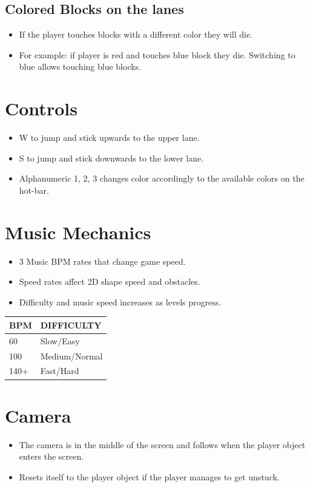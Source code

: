 \documentclass[11pt,a4paper]{report}
\begin{document}
\subsection{Colored Blocks on the lanes}
\begin{itemize}
  \item If the player touches blocks with a different color they will die.
  \item For example: if player is red and touches blue block they die. Switching to blue allows touching blue blocks.
\end{itemize}

\section{Controls}
\label{sec:controls}
\begin{itemize}
  \item W to jump and stick upwards to the upper lane.
  \item S to jump and stick downwards to the lower lane.
  \item Alphanumeric 1, 2, 3 changes color accordingly to the available colors on the hot-bar.
\end{itemize}

\section{Music Mechanics}
\label{sec:music}
\begin{itemize}
  \item 3 Music BPM rates that change game speed.
  \item Speed rates affect 2D shape speed and obstacles.
  \item Difficulty and music speed increases as levels progress.
\end{itemize}

\begin{center}
\begin{tabular}{ll}
BPM & DIFFICULTY \\\hline
60 & Slow/Easy \\
100 & Medium/Normal \\
140+ & Fast/Hard \\
\end{tabular}
\end{center}

\section{Camera}
\begin{itemize}
  \item The camera is in the middle of the screen and follows when the player object enters the screen.
  \item Resets itself to the player object if the player manages to get unstuck.
\end{itemize}
\end{document}
